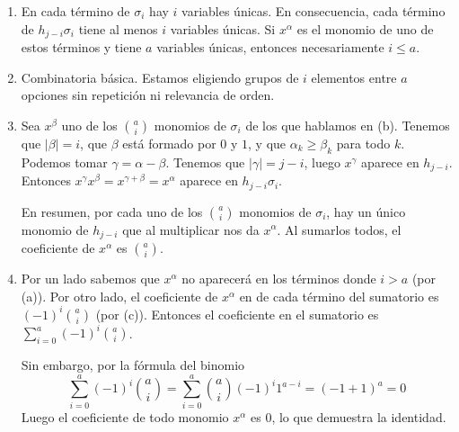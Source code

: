 \documentclass[twoside]{article}
\begin{document}
\begin{solucion}
\mbox{}
\begin{enumerate}
\item En cada término de $σ_i$ hay $i$ variables únicas.
En consecuencia, cada término de $h_{j-i} σ_i$ tiene al menos $i$ variables únicas.
Si $x^α$ es el monomio de uno de estos términos y tiene $a$ variables únicas, entonces necesariamente $i ≤ a$.
\item Combinatoria básica. Estamos eligiendo grupos de $i$ elementos entre $a$ opciones sin repetición ni relevancia de orden.
\item Sea $x^β$ uno de los $\binom{a}{i}$ monomios de $σ_i$ de los que hablamos en (b).
Tenemos que $|β|=i$, que $β$ está formado por $0$ y $1$, y que $α_k ≥ β_k$ para todo $k$.
Podemos tomar $γ = α-β$.
Tenemos que $|γ| = j-i$, luego $x^γ$ aparece en $h_{j-i}$.
Entonces $x^γ x^β = x^{γ+β} = x^α$ aparece en $h_{j-i} σ_i$.

En resumen, por cada uno de los $\binom{a}{i}$ monomios de $σ_i$, hay un único monomio de $h_{j-i}$ que al multiplicar nos da $x^α$.
Al sumarlos todos, el coeficiente de $x^α$ es $\binom{a}{i}$.
\item Por un lado sabemos que $x^α$ no aparecerá en los términos donde $i > a$ (por (a)).
Por otro lado, el coeficiente de $x^α$ en de cada término del sumatorio es $(-1)^i \binom{a}{i}$ (por (c)).
Entonces el coeficiente en el sumatorio es $\sum_{i=0}^a (-1)^i \binom{a}{i}$.

Sin embargo, por la fórmula del binomio
\[
\sum_{i=0}^a (-1)^i \binom{a}{i} = \sum_{i=0}^a \binom{a}{i} (-1)^i 1^{a-i} = (-1+1)^a = 0
\]
Luego el coeficiente de todo monomio $x^α$ es $0$, lo que demuestra la identidad.
\end{enumerate}
\end{solucion}

\newpage
\end{document}
